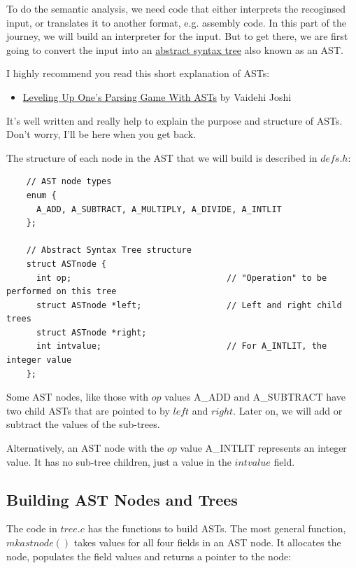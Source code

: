 \documentclass[journal, onecolumn, 12pt]{IEEEtran}
\begin{document}
To do the semantic analysis, we need code that either interprets the recoginsed input, or translates it to another format, e.g. assembly code. In this part of the journey, we will build an interpreter for the input. But to get there, we are first going to convert the input into an \href{https://en.wikipedia.org/wiki/Abstract_syntax_tree}{abstract syntax tree} also known as an AST.

I highly recommend you read this short explanation of ASTs:
\begin{itemize}
    \item \href{https://medium.com/basecs/leveling-up-ones-parsing-game-with-asts-d7a6fc2400ff}{Leveling Up One’s Parsing Game With ASTs} by Vaidehi Joshi
\end{itemize}

It's well written and really help to explain the purpose and structure of ASTs. Don't worry, I'll be here when you get back.

The structure of each node in the AST that we will build is described in $defs.h$:

\begin{lstlisting}
    // AST node types
    enum {
      A_ADD, A_SUBTRACT, A_MULTIPLY, A_DIVIDE, A_INTLIT
    };

    // Abstract Syntax Tree structure
    struct ASTnode {
      int op;                               // "Operation" to be performed on this tree
      struct ASTnode *left;                 // Left and right child trees
      struct ASTnode *right;
      int intvalue;                         // For A_INTLIT, the integer value
    };
\end{lstlisting}

Some AST nodes, like those with $op$ values A\_ADD and A\_SUBTRACT have two child ASTs that are pointed to by $left$ and $right$. Later on, we will add or subtract the values of the sub-trees.

Alternatively, an AST node with the $op$ value A\_INTLIT represents an integer value. It has no sub-tree children, just a value in the $intvalue$ field.

\subsection{Building AST Nodes and Trees}

The code in $tree.c$ has the functions to build ASTs. The most general function, $mkastnode()$ takes values for all four fields in an AST node. It allocates the node, populates the field values and returns a pointer to the node:
\end{document}
